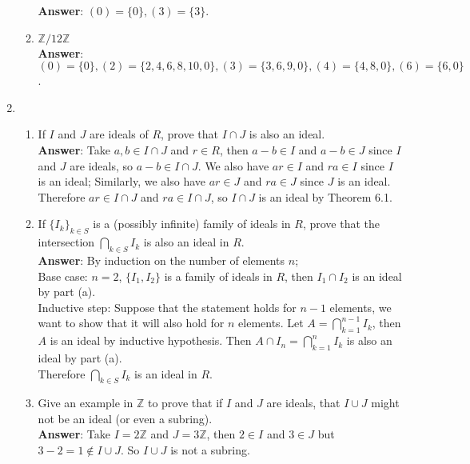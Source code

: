 \documentclass{article}
\begin{document}
\begin{enumerate}
\begin{enumerate}
                        \textbf{Answer}: $(0)=\{0\},(3)=\{3\}$.
                  \item $\mathbb{Z}/12\mathbb{Z}$\\
                        \textbf{Answer}: $(0)=\{0\},(2)=\{2,4,6,8,10,0\},(3)=\{3,6,9,0\},(4)=\{4,8,0\},(6)=\{6,0\}$.
            \end{enumerate}
      \item
            \begin{enumerate}
                  \item If $I$ and $J$ are ideals of $R$, prove that $I\cap J$ is also an ideal.\\
                        \textbf{Answer}: Take $a,b\in I\cap J$ and $r\in R$, then $a-b\in I$ and $a-b\in J$ since $I$ and $J$ are ideals, so $a-b\in I\cap J$. We also have $ar\in I$ and $ra\in I$ since $I$ is an ideal; Similarly, we also have $ar\in J$ and $ra\in J$ since $J$ is an ideal. Therefore $ar\in I\cap J$ and $ra\in I\cap J$, so $I\cap J$ is an ideal by Theorem 6.1.
                  \item If $\{I_k\}_{k\in S}$ is a (possibly infinite) family of ideals in $R$, prove that the intersection $\bigcap_{k\in S}I_k$ is also an ideal in $R$.\\
                        \textbf{Answer}: By induction on the number of elements $n$;\\
                        Base case: $n=2$, $\{I_1,I_2\}$ is a family of ideals in $R$, then $I_1\cap I_2$ is an ideal by part (a).\\
                        Inductive step: Suppose that the statement holds for $n-1$ elements, we want to show that it will also hold for $n$ elements. Let $A=\bigcap_{k=1}^{n-1}I_k$, then $A$ is an ideal by inductive hypothesis. Then $A\cap I_n=\bigcap_{k=1}^nI_k$ is also an ideal by part (a).\\
                        Therefore $\bigcap_{k\in S}I_k$ is an ideal in $R$.
                  \item Give an example in $\mathbb{Z}$ to prove that if $I$ and $J$ are ideals, that $I\cup J$ might not be an ideal (or even a subring).\\
                        \textbf{Answer}: Take $I=2\mathbb{Z}$ and $J=3\mathbb{Z}$, then $2\in I$ and $3\in J$ but $3-2=1\notin I\cup J$. So $I\cup J$ is not a subring.
            \end{enumerate}
\end{enumerate}
\end{document}
